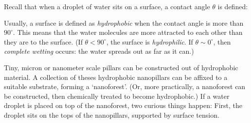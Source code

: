 \documentclass[a4paper]{report}
\begin{document}
Recall that when a droplet of water sits on a surface, a contact angle $\theta$ is defined:

\begin{center}
\end{center}

Usually, a surface is defined as \emph{hydrophobic} when the contact angle is more than $90^{\circ}$.  This means that the water molecules are more attracted to each other than they are to the surface. (If $\theta < 90^{\circ}$, the surface is \emph{hydrophilic}.  If $\theta \sim 0^{\circ}$, then \emph{complete wetting} occurs: the water spreads out as far as it can.)

Tiny, micron or nanometer scale pillars can be constructed out of hydrophobic material.  A collection of theses hydrophobic nanopillars can be affixed to a suitable substrate, forming a `nanoforest'.  (Or, more practically, a nanoforest can be constructed, then chemically treated to become hydrophobic.)  If a water droplet is placed on top of the nanoforest, two curious things happen:  First, the droplet sits on the tops of the nanopillars, supported by surface tension.

\begin{center}
\end{center}
\end{document}
